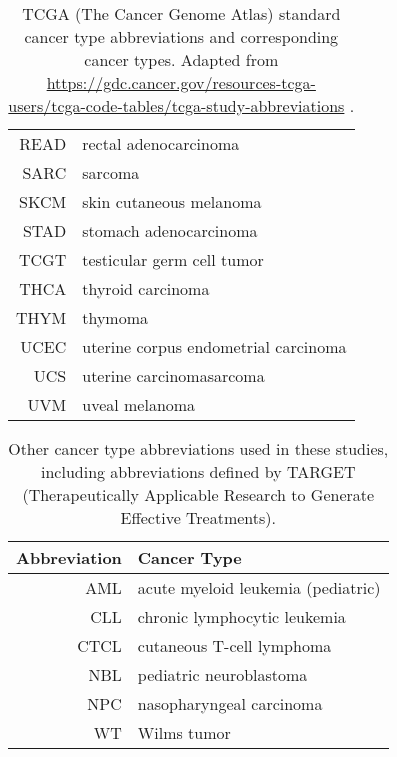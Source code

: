 \begin{table}[H]
\begin{center}
\begin{tabular}{r|l}
            READ & rectal adenocarcinoma \\
            SARC & sarcoma \\
            SKCM & skin cutaneous melanoma \\
            STAD & stomach adenocarcinoma \\
            TCGT & testicular germ cell tumor \\
            THCA & thyroid carcinoma \\
            THYM & thymoma \\
            UCEC & uterine corpus endometrial carcinoma \\
            UCS & uterine carcinomasarcoma \\
            UVM & uveal melanoma
        \end{tabular}
    \end{center}
    \vspace{-0.3cm}
    \caption[TCGA standard cancer type abbreviations.]{TCGA (The Cancer Genome Atlas) standard cancer type abbreviations and corresponding cancer types. Adapted from \url{https://gdc.cancer.gov/resources-tcga-users/tcga-code-tables/tcga-study-abbreviations} \cite{tcgageneric}.}
\end{table}

\begin{table}[H]
    \begin{center}
        \small
        \begin{tabular}{r|l}
            \textbf{Abbreviation} & \textbf{Cancer Type} \\
            \hline
            AML & acute myeloid leukemia (pediatric) \\
            CLL & chronic lymphocytic leukemia \\
            CTCL & cutaneous T-cell lymphoma \\
            NBL & pediatric neuroblastoma \\
            NPC & nasopharyngeal carcinoma \\
            WT & Wilms tumor
        \end{tabular}
    \end{center}
    \vspace{-0.3cm}
    \caption[Other cancer type abbreviations.]{Other cancer type abbreviations used in these studies, including abbreviations defined by TARGET (Therapeutically Applicable Research to Generate Effective Treatments).}
\end{table}
